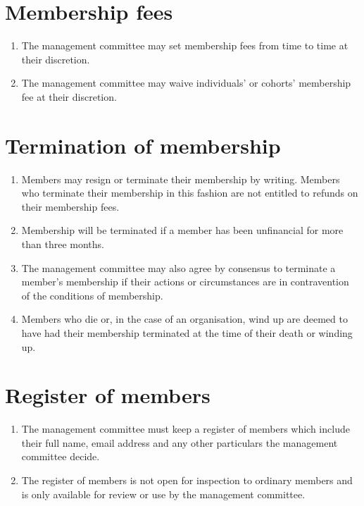 \documentclass[11pt, oneside]{article}
\begin{document}
\section{Membership fees}
\begin{enumerate}
\item The management committee may set membership fees from time to time at their discretion. 
\item The management committee may waive individuals’ or cohorts’ membership fee at their discretion.
\end{enumerate}

\section{Termination of membership}
\begin{enumerate}

\item Members may resign or terminate their membership by writing. Members who terminate their membership in this fashion are not entitled to refunds on their membership fees. 
\item Membership will be terminated if a member has been unfinancial for more than three months. 
\item The management committee may also agree by consensus to terminate a member’s membership if their actions or circumstances are in contravention of the conditions of membership. 
\item Members who die or, in the case of an organisation, wind up are deemed to have had their membership terminated at the time of their death or winding up. 
\end{enumerate}

\section{Register of members}
\begin{enumerate}
\item The management committee must keep a register of members which include their full name, email address and any other particulars the management committee decide. 
\item The register of members is not open for inspection to ordinary members and is only available for review or use by the management committee. 
\end{enumerate}
\end{document}
